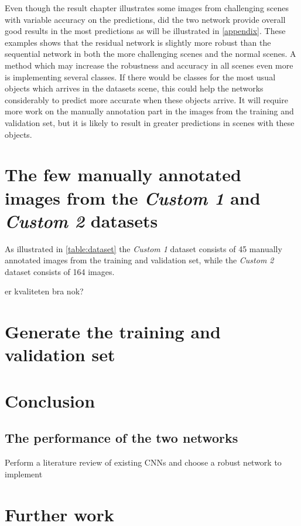 \documentclass[USenglish]{ifimaster}  %
\begin{document}
Even though the result chapter illustrates some images from challenging scenes with variable accuracy on the predictions, did the two network provide overall good results in the most predictions as will be illustrated in \cref{appendix}. These examples shows that the residual network is slightly more robust than the sequential network in both the more challenging scenes and the normal scenes. A method which may increase the robustness and accuracy in all scenes even more is implementing several classes. If there would be classes for the most usual objects which arrives in the datasets scene, this could help the networks considerably to predict more accurate when these objects arrive. It will require more work on the manually annotation part in the images from the training and validation set, but it is likely to result in greater predictions in scenes with these objects. 

\section{The few manually annotated images from the \textit{Custom 1} and \textit{Custom 2} datasets}
As illustrated in \cref{table:dataset} the \textit{Custom 1} dataset consists of 45 manually annotated images from the training and validation set, while the \textit{Custom 2} dataset consists of 164 images. 


er kvaliteten bra nok?

\section{Generate the training and validation set}

\section{Conclusion}
\subsection{The performance of the two networks}
Perform a literature review of existing CNNs and choose a robust network to implement
\section{Further work}
\end{document}
